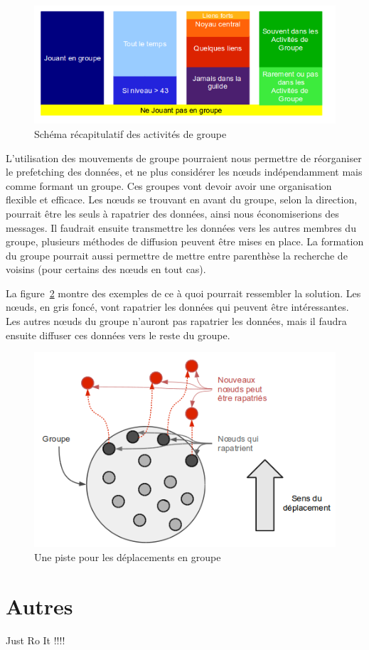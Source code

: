 \documentclass[11pt,a4paper]{article}
\begin{document}
	\vspace{1cm}
        \begin{figure}[!h]
        \centering
        \includegraphics[scale=0.65]{./images/recapstat.png}
        \caption{Schéma récapitulatif des activités de groupe}
        \label{recapstat}
        \end{figure}
\par L'utilisation des mouvements de groupe pourraient nous permettre de réorganiser le prefetching des données, et ne plus considérer les nœuds indépendamment mais comme formant un groupe. Ces groupes vont devoir avoir une organisation flexible et efficace. Les nœuds se trouvant en avant du groupe, selon la direction, pourrait être les seuls à rapatrier des données, ainsi nous économiserions des messages. Il faudrait ensuite transmettre les données vers les autres membres du groupe, plusieurs méthodes de diffusion peuvent être mises en place. La formation du groupe pourrait aussi permettre de mettre entre parenthèse la recherche de voisins (pour certains des nœuds en tout cas). 
\par La figure~\ref{mouvgroup} montre des exemples de ce à quoi pourrait ressembler la solution. Les nœuds, en gris foncé, vont rapatrier les données qui peuvent être intéressantes. Les autres nœuds du groupe n'auront pas rapatrier les données, mais il faudra ensuite diffuser ces données vers le reste du groupe.
	\vspace{1cm}
        \begin{figure}[!h]
        \centering
        \includegraphics[scale=0.65]{./images/mouvgroup.png}
        \caption{Une piste pour les déplacements en groupe}
        \label{mouvgroup}
        \end{figure}

\newpage
\section{Autres}
Just Ro It !!!!


\newpage




 
\end{document}
